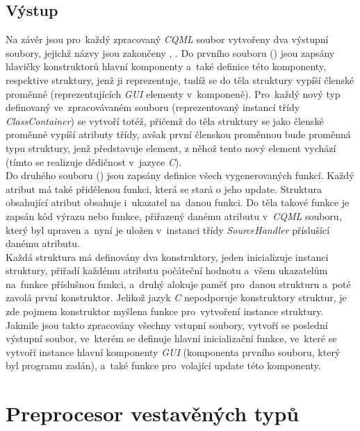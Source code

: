 \documentclass[11pt,twoside,a4paper]{book}
\begin{document}
\subsection{Výstup}
Na závěr jsou pro~každý zpracovaný \textit{CQML} soubor vytvořeny dva výstupní soubory, jejichž názvy jsou zakončeny , . 
Do prvního souboru () jsou zapsány hlavičky konstruktorů hlavní komponenty a~také definice této komponenty, respektive struktury, jenž ji reprezentuje, tudíž se do těla struktury vypíší členské proměnné (reprezentujících \textit{GUI} elementy v~komponeně). Pro~každý nový typ definovaný ve~zpracovávaném souboru (reprezentovaný instancí třídy \textit{ClassContainer}) se vytvoří totéž, přičemž do těla struktury se jako členské proměnné vypíší atributy třídy, avšak první členskou proměnnou bude proměnná typu struktury, jenž představuje element, z něhož tento nový element vychází (tímto se realizuje dědičnost v~jazyce \textit{C}).\\
Do druhého souboru () jsou zapsány definice všech vygenerovaných funkcí. Každý atribut má také přidělenou funkci, která se stará o jeho update. Struktura obsahující atribut obsahuje i~ukazatel na~danou funkci. Do těla takové funkce je zapsán kód výrazu nebo funkce, přiřazený danému atributu v~\textit{CQML} souboru, který byl upraven a~nyní je uložen v~instanci třídy \textit{SourceHandler} příslušící danému atributu.\\
Každá struktura má definovány dva konstruktory, jeden inicializuje instanci struktury, přiřadí každému atributu počáteční hodnotu a~všem ukazatelům na~funkce příslušnou funkci, a~druhý alokuje paměť pro~danou strukturu a~poté zavolá první konstruktor. Jelikož jazyk \textit{C} nepodporuje konstruktory struktur, je zde pojmem konstruktor myšlena funkce pro~vytvoření instance struktury.\\
Jakmile jsou takto zpracovány všechny vstupní soubory, vytvoří se poslední výstupní soubor, ve~kterém se definuje hlavní inicializační funkce, ve~které se vytvoří instance hlavní komponenty \textit{GUI} (komponenta prvního souboru, který byl programu zadán), a~také funkce pro~volající update této komponenty.\\


\section{\label{SEC:aa}Preprocesor vestavěných typů}
\end{document}
